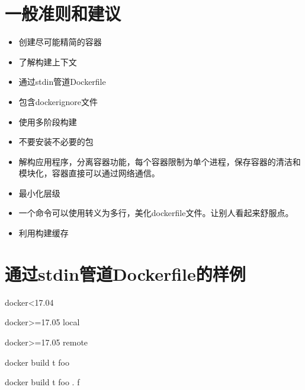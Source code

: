 \documentclass[letterpaper,10pt,english]{sphinxmanual}
\begin{document}
\section{一般准则和建议}
\label{\detokenize{_u8fd0_u884c_u5e94_u7528/02-dockerfile_u7f16_u5199_u6700_u4f73_u5b9e_u8df5:id1}}\begin{itemize}
\item {} 
创建尽可能精简的容器

\item {} 
了解构建上下文

\item {} 
通过stdin管道Dockerfile

\item {} 
包含dockerignore文件

\item {} 
使用多阶段构建

\item {} 
不要安装不必要的包

\item {} 
解构应用程序，分离容器功能，每个容器限制为单个进程，保存容器的清洁和模块化，容器直接可以通过网络通信。

\item {} 
最小化层级

\item {} 
一个命令可以使用转义为多行，美化dockerfile文件。让别人看起来舒服点。

\item {} 
利用构建缓存

\end{itemize}


\section{通过stdin管道Dockerfile的样例}
\label{\detokenize{_u8fd0_u884c_u5e94_u7528/02-dockerfile_u7f16_u5199_u6700_u4f73_u5b9e_u8df5:stdindockerfile}}
docker\textless{}17.04

docker\textgreater{}=17.05 local

docker\textgreater{}=17.05 remote

%
\begin{sphinxVerbatim}[commandchars=\\\{\}]
docker build \PYGZhy{}t foo \PYGZhy{}
\end{sphinxVerbatim}

%
\begin{sphinxVerbatim}[commandchars=\\\{\}]
docker build \PYGZhy{}t foo . \PYGZhy{}f\PYGZhy{}
\end{sphinxVerbatim}
\end{document}
